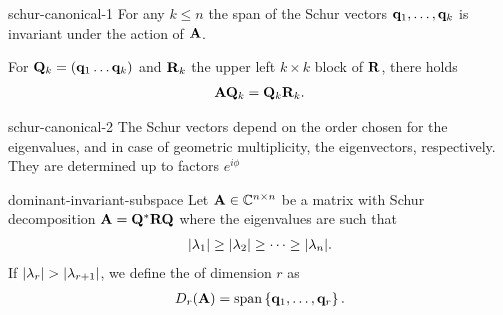 \begin{Lemma}{schur-canonical-1}
  For any $k\le n$ the span of the Schur vectors
  $\mathbf q_1,\dots,\mathbf q_k$ is invariant under the action of $\mathbf A$.

  For $\mathbf Q_k = (\mathbf q_1\dots\mathbf q_k)$ and $\mathbf R_k$ the upper left $k\times k$ block of $\mathbf R$, there holds
  \begin{gather}
    \mathbf A\mathbf Q_k = \mathbf Q_k \mathbf R_k.
  \end{gather}
\end{Lemma}

\begin{Lemma}{schur-canonical-2}
  The Schur vectors depend on the order chosen for the eigenvalues,
  and in case of geometric multiplicity, the eigenvectors,
  respectively. They are determined up to factors $e^{i\phi}$
\end{Lemma}

\begin{Definition}{dominant-invariant-subspace}
  Let $\mathbf A\in\mathbb C^{n\times n}$ be a matrix with Schur decomposition
  $\mathbf A = \mathbf Q^*\mathbf R\mathbf Q$ where the eigenvalues are such that
  \begin{gather}
    \lvert\lambda_1\rvert\ge\lvert\lambda_2\rvert\ge\dots\ge\lvert\lambda_n\rvert.
  \end{gather}
  If $\lvert\lambda_r\rvert>\lvert\lambda_{r+1}\rvert$, we define the
   of dimension $r$ as
  \begin{gather}
    D_r(\mathbf A) = \operatorname{span}\left\{\mathbf q_1,\dots,\mathbf q_r\right\}.
  \end{gather}
\end{Definition}

